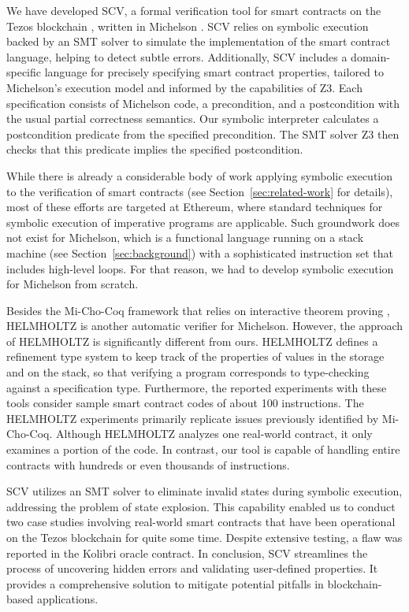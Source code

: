 \documentclass[runningheads]{llncs}
\begin{document}
We have developed SCV, a formal verification tool for smart contracts
on the Tezos blockchain \cite{tezos-whitepaper}, written in Michelson
\cite{michelson}. SCV relies on symbolic execution backed by an SMT
solver to simulate the implementation of the smart contract language,
helping to detect subtle errors. Additionally, SCV includes a
domain-specific language for precisely specifying smart contract
properties, tailored to Michelson's execution model and informed by
the capabilities of Z3. Each specification consists of Michelson code, a precondition, and a postcondition with the usual partial correctness semantics. Our symbolic interpreter calculates a postcondition predicate from the specified precondition. The SMT solver Z3 \cite{z3} then checks that this predicate implies the specified postcondition.

While there is already a considerable body of work applying symbolic
execution to the verification of smart contracts
\cite{securify,manticore,kevm,park} (see
Section~\ref{sec:related-work} for details), most of these efforts are
targeted at Ethereum, where standard techniques for symbolic execution
of imperative programs are applicable. Such groundwork does not exist
for Michelson, which is a functional language running on a stack
machine (see Section~\ref{sec:background}) with a sophisticated
instruction set that includes high-level loops. For that reason, we
had to develop symbolic execution for Michelson from scratch. 

Besides the Mi-Cho-Coq framework that relies on interactive theorem
proving \cite{micho}, HELMHOLTZ \cite{helmholtz} is another automatic
verifier for Michelson. However, the approach of HELMHOLTZ is
significantly different from ours. HELMHOLTZ defines a refinement type
system to keep track of the properties of values in the storage and on
the stack, so that verifying a program corresponds to type-checking
against a specification type.
Furthermore, the reported experiments with these tools consider sample
smart contract codes of about 100 instructions. The HELMHOLTZ
experiments primarily replicate issues previously identified by
Mi-Cho-Coq. Although HELMHOLTZ analyzes one real-world contract, it
only examines a portion of the code. In contrast, our tool is capable
of handling entire contracts with hundreds or even thousands of
instructions. 

SCV utilizes an SMT solver to eliminate invalid states during symbolic
execution, addressing the problem of state explosion. This capability
enabled us to conduct two case studies involving real-world smart contracts
that have been operational on the Tezos blockchain for quite some
time. Despite extensive testing, a flaw was reported in the Kolibri
oracle contract. In conclusion, SCV streamlines the process of
uncovering hidden errors and validating user-defined properties. It
provides a comprehensive solution to mitigate potential pitfalls in
blockchain-based applications. 
\end{document}
